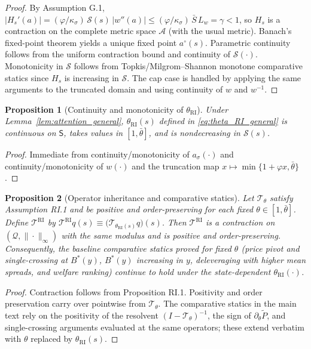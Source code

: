 \documentclass[12pt]{article}
\theoremstyle{plain}
\newtheorem{proposition}{Proposition}
\begin{document}
\begin{proof}
	By Assumption G.1, $|H_s'(a)|= (\varphi/\kappa_\sigma)\,\mathcal S(s)\,|w''(a)|\le (\varphi/\kappa_\sigma)\,\bar S\,L_w=\gamma<1$, so $H_s$ is a contraction on the complete metric space $\mathcal A$ (with the usual metric). Banach's fixed-point theorem yields a unique fixed point $a^{\circ}(s)$. Parametric continuity follows from the uniform contraction bound and continuity of $\mathcal S(\cdot)$. Monotonicity in $\mathcal S$ follows from Topkis/Milgrom–Shannon monotone comparative statics since $H_s$ is increasing in $\mathcal S$. The cap case is handled by applying the same arguments to the truncated domain and using continuity of $w$ and $w^{-1}$.
\end{proof}

\begin{proposition}[Continuity and monotonicity of $\theta_{\mathrm{RI}}$]\label{prop:theta_continuity_general}
	Under Lemma~\ref{lem:attention_general}, $\theta_{\mathrm{RI}}(s)$ defined in \eqref{eq:theta_RI_general} is continuous on $\mathsf S$, takes values in $[1,\bar\theta]$, and is nondecreasing in $\mathcal S(s)$.
\end{proposition}

\begin{proof}
	Immediate from continuity/monotonicity of $a_\sigma(\cdot)$ and continuity/monotonicity of $w(\cdot)$ and the truncation map $x\mapsto\min\{1+\varphi x,\bar\theta\}$.
\end{proof}

\begin{proposition}[Operator inheritance and comparative statics]\label{prop:inheritance_general}
	Let $\mathcal T_\theta$ satisfy Assumption RI.1 and be positive and order-preserving for each fixed $\theta\in[1,\bar\theta]$. Define $\mathcal T^{\mathrm{RI}}$ by $\mathcal T^{\mathrm{RI}}q(s)\equiv \big(\mathcal T_{\theta_{\mathrm{RI}}(s)}q\big)(s)$. Then $\mathcal T^{\mathrm{RI}}$ is a contraction on $(\mathcal Q,\|\cdot\|_\infty)$ with the same modulus and is positive and order-preserving. Consequently, the baseline comparative statics proved for fixed $\theta$ (price pivot and single-crossing at $B^*(y)$, $B^*(y)$ increasing in $y$, deleveraging with higher mean spreads, and welfare ranking) continue to hold under the state-dependent $\theta_{\mathrm{RI}}(\cdot)$.
\end{proposition}

\begin{proof}
	Contraction follows from Proposition RI.1. Positivity and order preservation carry over pointwise from $\mathcal T_\theta$. The comparative statics in the main text rely on the positivity of the resolvent $(I-\mathcal T_\theta)^{-1}$, the sign of $\partial_\theta \tilde P$, and single-crossing arguments evaluated at the same operators; these extend verbatim with $\theta$ replaced by $\theta_{\mathrm{RI}}(s)$.
\end{proof}
\end{document}
